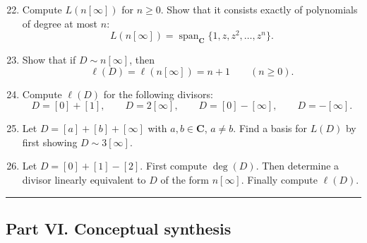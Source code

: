 \documentclass[11pt,openany]{article}
\begin{document}
\begin{enumerate}
	\setcounter{enumi}{21}
	
	\item Compute \(L(n[\infty])\) for \(n\ge 0\). Show that it consists exactly of polynomials of degree at most \(n\):
	\[
	L(n[\infty])=\operatorname{span}_{\mathbf{C}}\{1,z,z^2,\dots,z^n\}.
	\]
	
	\item Show that if \(D\sim n[\infty]\), then
	\[
	\ell(D)=\ell(n[\infty])=n+1 \qquad (n\ge 0).
	\]
	
	\item Compute \(\ell(D)\) for the following divisors:
	\[
	D=[0]+[1], \qquad D=2[\infty], \qquad D=[0]-[\infty], \qquad D=-[\infty].
	\]
	
	\item Let \(D=[a]+[b]+[\infty]\) with \(a,b\in\mathbf{C}\), \(a\neq b\).  
	Find a basis for \(L(D)\) by first showing \(D\sim 3[\infty]\).
	
	\item Let \(D=[0]+[1]-[2]\).  
	First compute \(\deg(D)\). Then determine a divisor linearly equivalent to \(D\) of the form \(n[\infty]\). Finally compute \(\ell(D)\).
\end{enumerate}

\bigskip
\hrule
\bigskip

\subsection*{Part VI. Conceptual synthesis}
\end{document}
